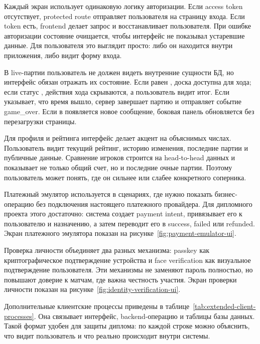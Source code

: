 Каждый экран использует одинаковую логику авторизации. Если access token отсутствует, protected route отправляет пользователя на страницу входа. Если token есть, frontend делает запрос  и восстанавливает пользователя. При ошибке авторизации состояние очищается, чтобы интерфейс не показывал устаревшие данные. Для пользователя это выглядит просто: либо он находится внутри приложения, либо видит форму входа.

В live-партии пользователь не должен видеть внутренние сущности БД, но интерфейс обязан отражать их состояние. Если  равен , доска доступна для хода; если статус , действия хода скрываются, а пользователь видит итог. Если  указывает, что время вышло, сервер завершает партию и отправляет событие game_over. Если в  появляется новое сообщение, боковая панель обновляется без перезагрузки страницы.

Для профиля и рейтинга интерфейс делает акцент на объяснимых числах. Пользователь видит текущий рейтинг, историю изменения, последние партии и публичные данные. Сравнение игроков строится на head-to-head данных и показывает не только общий счет, но и последние очные партии. Поэтому пользователь может понять, где он сильнее или слабее конкретного соперника.


Платежный эмулятор используется в сценариях, где нужно показать бизнес-операцию без подключения настоящего платежного провайдера. Для дипломного проекта этого достаточно: система создает payment intent, привязывает его к пользователю и назначению, а затем переводит его в success, failed или refunded. Экран платежного эмулятора показан на рисунке~\ref{fig:payment-emulator-ui}.


Проверка личности объединяет два разных механизма: passkey как криптографическое подтверждение устройства и face verification как визуальное подтверждение пользователя. Эти механизмы не заменяют пароль полностью, но повышают доверие к матчам, где важна честность участия. Экран проверки личности показан на рисунке~\ref{fig:identity-verification-ui}.


Дополнительные клиентские процессы приведены в таблице~\ref{tab:extended-client-processes}. Она связывает интерфейс, backend-операцию и таблицы базы данных. Такой формат удобен для защиты диплома: по каждой строке можно объяснить, что видит пользователь и что реально происходит внутри системы.

